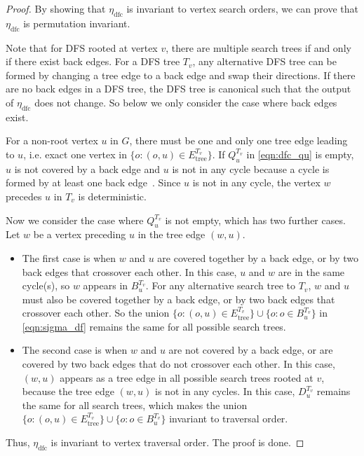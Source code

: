 \begin{proof}
By showing that $\eta_{\text{dfc}}$ is invariant to vertex search orders, we can prove that $\eta_{\text{dfc}}$ is permutation invariant.

Note that for DFS rooted at vertex $v$, there are multiple search trees if and only if there exist back edges. For a DFS tree $T_v$, any alternative DFS tree can be formed by changing a tree edge to a back edge and swap their directions. If there are no back edges in a DFS tree, the DFS tree is canonical such that the output of $\eta_{\text{dfc}}$ does not change. So below we only consider the case where back edges exist. 

For a non-root vertex $u$ in $G$, there must be one and only one tree edge leading to $u$, i.e. exact one vertex in $\{o:(o,u)\in E_{\text{tree}}^{T_v} \}$. If $Q_u^{T_v}$ in \cref{eqn:dfc_qu} is empty, $u$ is not covered by a back edge and $u$ is not in any cycle because a cycle is formed by at least one back edge~\citep{Cormen_algointro}. Since $u$ is not in any cycle, the vertex $w$ precedes $u$ in $T_v$ is deterministic.

Now we consider the case where $Q_u^{T_v}$ is not empty, which has two further cases. Let $w$ be a vertex preceding $u$ in the tree edge $(w,u)$. 

\begin{itemize}
    \item The first case is when $w$ and $u$ are covered together by a back edge, or by two back edges that crossover each other. In this case, $u$ and $w$ are in the same cycle(s), so $w$ appears in $B_u^{T_v}$. For any alternative search tree to $T_v$, $w$ and $u$ must also be covered together by a back edge, or by two back edges that crossover each other. So the union $\{o: (o,u) \in E_{\text{tree}}^{T_v}   \}
\cup  \{o: o \in B_u^{T_v}\}$ in \cref{eqn:sigma_df} remains the same for all possible search trees. 

\item The second case is when $w$ and $u$ are not covered by a back edge, or are covered by two back edges that do not crossover each other. In this case, $(w,u)$ appears as a tree edge in all possible search trees rooted at $v$, because the tree edge $(w,u)$ is not in any cycles. In this case, $D^{T_v}_u$ remains the same for all search trees, which makes the union $\{o: (o,u) \in E_{\text{tree}}^{T_v}  \}
\cup  \{o: o \in B_u^{T_v}\}$ invariant to traversal order. 
\end{itemize}
Thus, $\eta_{\text{dfc}}$ is invariant to vertex traversal order. The proof is done.
\end{proof}

